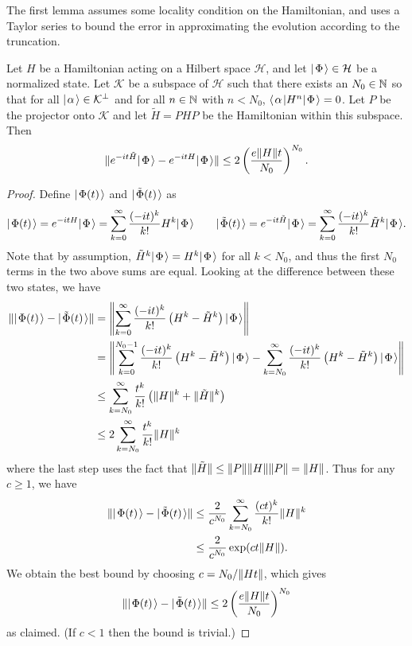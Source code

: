 \documentclass[../thesis-main/thesis-main]{subfiles}
\begin{document}
The first lemma assumes some locality condition on the Hamiltonian, and uses a Taylor series to bound the error in approximating the evolution according to the truncation.
\begin{proposition}
\label{prop:trunc_prop}Let $H$ be a Hamiltonian acting on a Hilbert
space $\mathcal{H}$, and let $|\mspace{2mu} \Phi \mspace{2mu} \rangle\in\mathcal{H}$ be a normalized state. Let
$\mathcal{K}$ be a subspace of $\mathcal{H}$ such that there exists an $N_0\in\mathbb{N}$
so that for all $|\mspace{2mu} \alpha \mspace{2mu} \rangle\in \mathcal{K}^{\perp}$ and for all $n\in\mathbb{N}$ with $n< N_0$, $\langle\mspace{2mu} \alpha \mspace{2mu} |H^{n}|\mspace{2mu} \Phi \mspace{2mu} \rangle=0$.
Let $P$ be the projector onto $\mathcal{K}$ and let $\tilde{H}=PHP$ be
the Hamiltonian within this subspace.  Then
\begin{align}
\|{e^{-it\tilde{H}}|\mspace{2mu} \Phi \mspace{2mu} \rangle-e^{-itH}|\mspace{2mu} \Phi \mspace{2mu} \rangle}\| \leq 2\left(\frac{e\|{H}\|t}{N_0}\right)^{N_0}.
\end{align}
\end{proposition}

\begin{proof}
Define $|\mspace{2mu} \Phi(t) \mspace{2mu} \rangle$ and $|\mspace{2mu} \tilde\Phi(t) \mspace{2mu} \rangle$
as
\begin{align}
|\mspace{2mu} \Phi(t) \mspace{2mu} \rangle=e^{-itH}|\mspace{2mu} \Phi \mspace{2mu} \rangle=\sum_{k=0}^{\infty}\frac{(-it)^{k}}{k!}H^{k}|\mspace{2mu} \Phi \mspace{2mu} \rangle\qquad|\mspace{2mu} \tilde\Phi(t) \mspace{2mu} \rangle=e^{-it\tilde{H}}|\mspace{2mu} \Phi \mspace{2mu} \rangle=\sum_{k=0}^{\infty}\frac{(-it)^{k}}{k!}\tilde{H}^{k}|\mspace{2mu} \Phi \mspace{2mu} \rangle.
\end{align}
Note that by assumption, $\tilde{H}^{k}|\mspace{2mu} \Phi \mspace{2mu} \rangle=H^{k}|\mspace{2mu} \Phi \mspace{2mu} \rangle$ for all $k< N_0$, and thus the first $N_0$ terms in the two above sums are equal. Looking at the difference between these two states, we have
\begin{align}
\|{|\mspace{2mu} \Phi(t) \mspace{2mu} \rangle-|\mspace{2mu} \tilde\Phi(t) \mspace{2mu} \rangle}\| & =\left\|{\sum_{k=0}^{\infty}\frac{(-it)^{k}}{k!}\left(H^{k}-\tilde{H}^{k}\right)|\mspace{2mu} \Phi \mspace{2mu} \rangle}\right\|\\
 & =\left\|{\sum_{k=0}^{N_0-1}\frac{(-it)^{k}}{k!}\left(H^{k}-\tilde{H}^{k}\right)|\mspace{2mu} \Phi \mspace{2mu} \rangle-\sum_{k=N_0}^{\infty}\frac{(-it)^{k}}{k!}\left(H^{k}-\tilde{H}^{k}\right)|\mspace{2mu} \Phi \mspace{2mu} \rangle}\right\|\\
 & \leq\sum_{k=N_0}^{\infty}\frac{t^{k}}{k!}\left(\|{H}\|^{k}+\|{\tilde{H}}\|^{k}\right) \\
 & \leq 2\sum_{k=N_0}^{\infty}\frac{t^{k}}{k!} \|{H}\|^{k}
\end{align}
where the last step uses the fact that $\|{\tilde{H}}\|\leq\|{P}\|\|{H}\|\|{P}\| = \|{H}\|$.  Thus for any $c \ge 1$, we have
\begin{align}
\|{|\mspace{2mu} \Phi(t) \mspace{2mu} \rangle-|\mspace{2mu} \tilde\Phi(t) \mspace{2mu} \rangle}\|
 & \leq\frac{2}{c^{N_0}}\sum_{k=N_0}^{\infty}\frac{(ct)^{k}}{k!}\|{H}\|^{k}\\
 & \leq\frac{2}{c^{N_0}}\exp(ct\|{H}\|).
\end{align}
We obtain the best bound by choosing $c=N_0/\|{Ht}\|$, which gives
\begin{align}
  \|{|\mspace{2mu} \Phi(t) \mspace{2mu} \rangle-|\mspace{2mu} \tilde\Phi(t) \mspace{2mu} \rangle}\|
  \le 2\left(\frac{e\|{H}\|t}{N_0}\right)^{N_0}
\end{align}
as claimed.  (If $c < 1$ then the bound is trivial.)
\end{proof}
\end{document}
